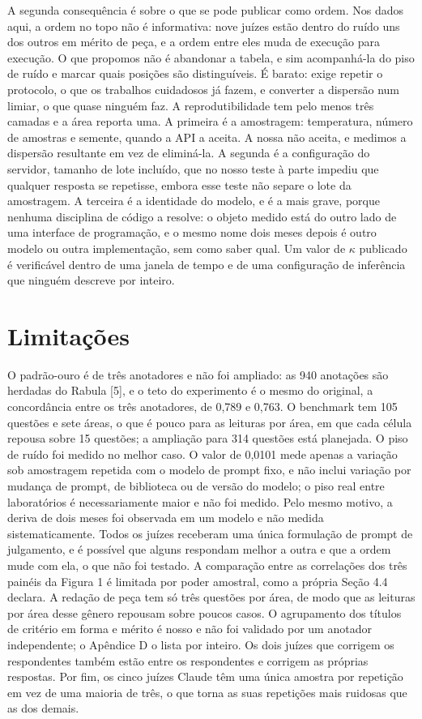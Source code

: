 \documentclass{IOS-Book-Article}
\begin{document}
A segunda consequência é sobre o que se pode publicar como ordem. Nos dados aqui, a ordem no topo não é informativa: nove juízes estão dentro do ruído uns dos outros em mérito de peça, e a ordem entre eles muda de execução para execução. O que propomos não é abandonar a tabela, e sim acompanhá-la do piso de ruído e marcar quais posições são distinguíveis. É barato: exige repetir o protocolo, o que os trabalhos cuidadosos já fazem, e converter a dispersão num limiar, o que quase ninguém faz. A reprodutibilidade tem pelo menos três camadas e a área reporta uma. A primeira é a amostragem: temperatura, número de amostras e semente, quando a API a aceita. A nossa não aceita, e medimos a dispersão resultante em vez de eliminá-la. A segunda é a configuração do servidor, tamanho de lote incluído, que no nosso teste à parte impediu que qualquer resposta se repetisse, embora esse teste não separe o lote da amostragem. A terceira é a identidade do modelo, e é a mais grave, porque nenhuma disciplina de código a resolve: o objeto medido está do outro lado de uma interface de programação, e o mesmo nome dois meses depois é outro modelo ou outra implementação, sem como saber qual. Um valor de $\kappa$ publicado é verificável dentro de uma janela de tempo e de uma configuração de inferência que ninguém descreve por inteiro.

\section{Limitações}

O padrão-ouro é de três anotadores e não foi ampliado: as 940 anotações são herdadas do Rabula [5], e o teto do experimento é o mesmo do original, a concordância entre os três anotadores, de 0,789 e 0,763. O benchmark tem 105 questões e sete áreas, o que é pouco para as leituras por área, em que cada célula repousa sobre 15 questões; a ampliação para 314 questões está planejada. O piso de ruído foi medido no melhor caso. O valor de 0,0101 mede apenas a variação sob amostragem repetida com o modelo de prompt fixo, e não inclui variação por mudança de prompt, de biblioteca ou de versão do modelo; o piso real entre laboratórios é necessariamente maior e não foi medido. Pelo mesmo motivo, a deriva de dois meses foi observada em um modelo e não medida sistematicamente. Todos os juízes receberam uma única formulação de prompt de julgamento, e é possível que alguns respondam melhor a outra e que a ordem mude com ela, o que não foi testado. A comparação entre as correlações dos três painéis da Figura 1 é limitada por poder amostral, como a própria Seção 4.4 declara. A redação de peça tem só três questões por área, de modo que as leituras por área desse gênero repousam sobre poucos casos. O agrupamento dos títulos de critério em forma e mérito é nosso e não foi validado por um anotador independente; o Apêndice D o lista por inteiro. Os dois juízes que corrigem os respondentes também estão entre os respondentes e corrigem as próprias respostas. Por fim, os cinco juízes Claude têm uma única amostra por repetição em vez de uma maioria de três, o que torna as suas repetições mais ruidosas que as dos demais.
\end{document}
